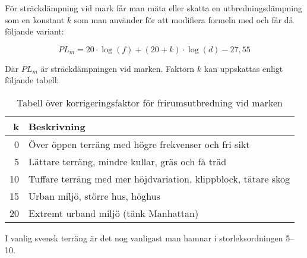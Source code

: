 För sträckdämpning vid mark får man mäta eller skatta en utbredningsdämpning som en konstant $k$ som man använder för att modifiera formeln med och får då följande variant:


\begin{equation*}
	PL_m = 20 \cdot \log(f) + (20+k) \cdot \log(d) - 27,55
\end{equation*}

Där $PL_m$ är sträckdämpningen vid marken. Faktorn $k$ kan uppskattas enligt följande tabell:

\begin{table}[h]
	\begin{centering}
		\begin{tabular}{r|l}
			\textbf{k} & \textbf{Beskrivning} \\ \hline
			0 & Över öppen terräng med högre frekvenser och fri sikt\\
			5 & Lättare terräng, mindre kullar, gräs och få träd \\
			10 & Tuffare terräng med mer höjdvariation, klippblock, tätare skog \\
			15 & Urban miljö, större hus, höghus \\
			20 & Extremt urband miljö (tänk Manhattan)\\
		\end{tabular}
	\end{centering}
	\label{tab:frirum-faktor}
	\caption{Tabell över korrigeringsfaktor för frirumsutbredning vid marken}
\end{table}

I vanlig svensk terräng är det nog vanligast man hamnar i storleksordningen 5--10.

